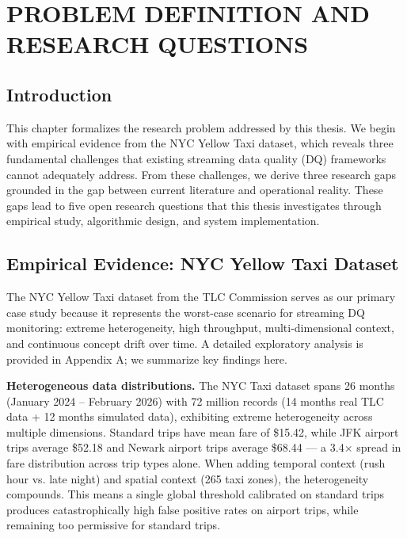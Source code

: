\chapter{PROBLEM DEFINITION AND RESEARCH QUESTIONS}

\section{Introduction}

This chapter formalizes the research problem addressed by this thesis. We begin with empirical evidence from the NYC Yellow Taxi dataset, which reveals three fundamental challenges that existing streaming data quality (DQ) frameworks cannot adequately address. From these challenges, we derive three research gaps grounded in the gap between current literature and operational reality. These gaps lead to five open research questions that this thesis investigates through empirical study, algorithmic design, and system implementation.

\section{Empirical Evidence: NYC Yellow Taxi Dataset}

The NYC Yellow Taxi dataset from the TLC Commission serves as our primary case study because it represents the worst-case scenario for streaming DQ monitoring: extreme heterogeneity, high throughput, multi-dimensional context, and continuous concept drift over time. A detailed exploratory analysis is provided in Appendix A; we summarize key findings here.

\textbf{Heterogeneous data distributions.} The NYC Taxi dataset spans 26 months (January 2024 -- February 2026) with 72 million records (14 months real TLC data + 12 months simulated data), exhibiting extreme heterogeneity across multiple dimensions. Standard trips have mean fare of \$15.42, while JFK airport trips average \$52.18 and Newark airport trips average \$68.44 --- a 3.4$\times$ spread in fare distribution across trip types alone. When adding temporal context (rush hour vs. late night) and spatial context (265 taxi zones), the heterogeneity compounds. This means a single global threshold calibrated on standard trips produces catastrophically high false positive rates on airport trips, while remaining too permissive for standard trips.

